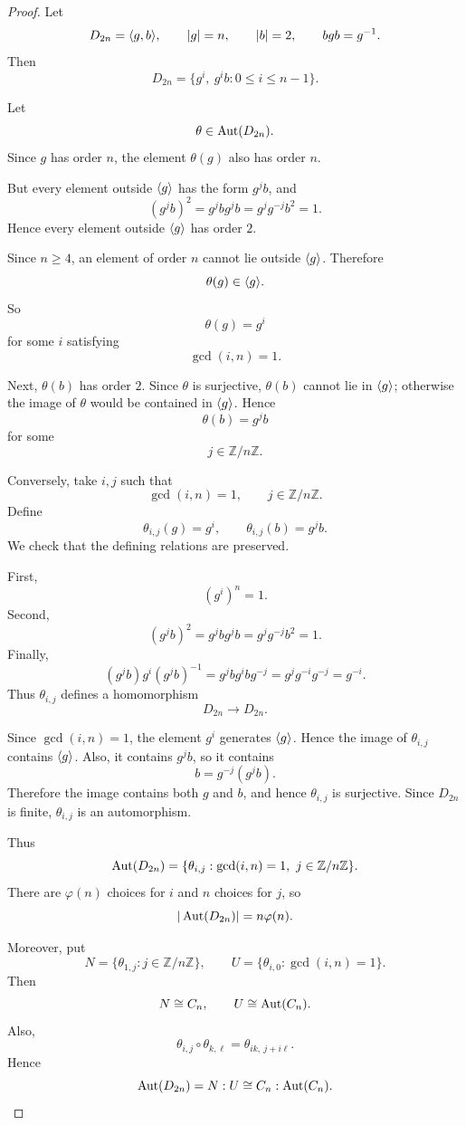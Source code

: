     \begin{proof}
    Let
    \[
        D_{2n}=\langle g,b\rangle,
        \qquad
        |g|=n,
        \qquad
        |b|=2,
        \qquad
        bgb=g^{-1}.
    \]
    Then
    \[
        D_{2n}
        =
        \{g^i,\ g^i b:0\leq i\leq n-1\}.
    \]
    
    Let
    \[
        \theta\in\operatorname{Aut}(D_{2n}).
    \]
    Since $g$ has order $n$, the element $\theta(g)$ also has order $n$.
    
    But every element outside $\langle g\rangle$ has the form $g^j b$, and
    \[
        (g^j b)^2
        =
        g^j b g^j b
        =
        g^j g^{-j}b^2
        =
        1.
    \]
    Hence every element outside $\langle g\rangle$ has order $2$.
    
    Since $n\geq 4$, an element of order $n$ cannot lie outside $\langle g\rangle$. Therefore
    \[
        \theta(g)\in\langle g\rangle.
    \]
    So
    \[
        \theta(g)=g^i
    \]
    for some $i$ satisfying
    \[
        \gcd(i,n)=1.
    \]
    
    Next, $\theta(b)$ has order $2$. Since $\theta$ is surjective, $\theta(b)$ cannot lie in $\langle g\rangle$; otherwise the image of $\theta$ would be contained in $\langle g\rangle$. Hence
    \[
        \theta(b)=g^j b
    \]
    for some
    \[
        j\in\mathbb Z/n\mathbb Z.
    \]
    
    Conversely, take $i,j$ such that
    \[
        \gcd(i,n)=1,
        \qquad
        j\in\mathbb Z/n\mathbb Z.
    \]
    Define
    \[
        \theta_{i,j}(g)=g^i,
        \qquad
        \theta_{i,j}(b)=g^j b.
    \]
    We check that the defining relations are preserved.
    
    First,
    \[
        (g^i)^n=1.
    \]
    Second,
    \[
        (g^j b)^2
        =
        g^j b g^j b
        =
        g^j g^{-j}b^2
        =
        1.
    \]
    Finally,
    \[
        (g^j b)g^i(g^j b)^{-1}
        =
        g^j b g^i b g^{-j}
        =
        g^j g^{-i}g^{-j}
        =
        g^{-i}.
    \]
    Thus $\theta_{i,j}$ defines a homomorphism
    \[
        D_{2n}\longrightarrow D_{2n}.
    \]
    
    Since $\gcd(i,n)=1$, the element $g^i$ generates $\langle g\rangle$. Hence the image of $\theta_{i,j}$ contains $\langle g\rangle$. Also, it contains $g^j b$, so it contains
    \[
        b=g^{-j}(g^j b).
    \]
    Therefore the image contains both $g$ and $b$, and hence $\theta_{i,j}$ is surjective. Since $D_{2n}$ is finite, $\theta_{i,j}$ is an automorphism.
    
    Thus
    \[
        \operatorname{Aut}(D_{2n})
        =
        \{\theta_{i,j}:\gcd(i,n)=1,\ j\in\mathbb Z/n\mathbb Z\}.
    \]
    There are $\varphi(n)$ choices for $i$ and $n$ choices for $j$, so
    \[
        |\operatorname{Aut}(D_{2n})|=n\varphi(n).
    \]
    
    Moreover, put
    \[
        N=\{\theta_{1,j}:j\in\mathbb Z/n\mathbb Z\},
        \qquad
        U=\{\theta_{i,0}:\gcd(i,n)=1\}.
    \]
    Then
    \[
        N\cong C_n,
        \qquad
        U\cong\operatorname{Aut}(C_n).
    \]
    Also,
    \[
        \theta_{i,j}\circ\theta_{k,\ell}
        =
        \theta_{ik,\ j+i\ell}.
    \]
    Hence
    \[
        \operatorname{Aut}(D_{2n})
        =
        N:U
        \cong
        C_n:\operatorname{Aut}(C_n).
    \]
    \end{proof}
    
